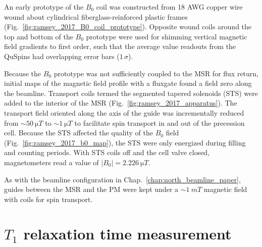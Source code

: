 An early prototype of the $B_0$ coil was constructed from 18 AWG copper wire wound about cylindrical fiberglass-reinforced plastic frames (Fig.~\ref{fig:ramsey_2017_B0_coil_prototype}). Opposite wound coils around the top and bottom of the $B_0$ prototype were used for shimming vertical magnetic field gradients to first order, such that the average value readouts from the QuSpins had overlapping error bars ($1\,\sigma$).

Because the $B_0$ prototype was not sufficiently coupled to the MSR for flux return, initial maps of the magnetic field profile with a fluxgate found a field zero along the \ucn beamline. Transport coils termed the segmented tapered solenoids (STS) were added to the interior of the MSR (Fig.~\ref{fig:ramsey_2017_apparatus}). The transport field oriented along the axis of the \ucn guide was incrementally reduced from $\sim\qty{50}{\micro T}$ to $\sim\qty{1}{\micro T}$ to facilitate spin transport in and out of the precession cell. Because the STS affected the quality of the $B_0$ field (Fig.~\ref{fig:ramsey_2017_b0_map}), the STS were only energized during filling and counting periods. With STS coils off and the cell valve closed, magnetometers read a value of $|B_0|=\qty{2.226}{\micro T}$.

As with the beamline configuration in Chap.~\ref{chap:north_beamline_paper}, guides between the MSR and the PM were kept under a $\sim\qty{1}{mT}$ magnetic field with coils for spin transport.


\section
{
    \texorpdfstring{$T_1$ relaxation time measurement}
                    {T1 relaxation time measurement}
}\label{sec:2017_t1_measurement}



